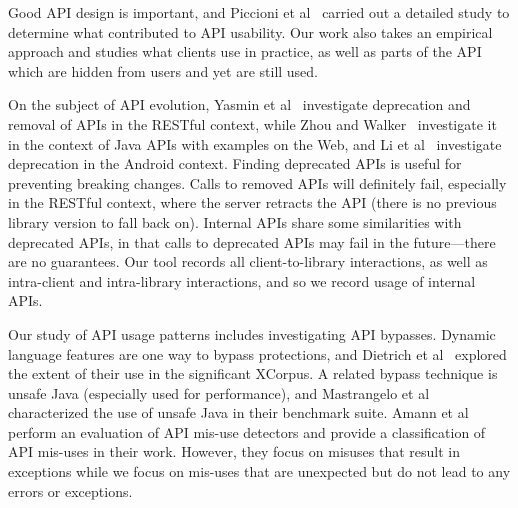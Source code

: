 Good API design is important, and Piccioni et al~\cite{piccioni13:_empir_study_api_usabil} carried out a detailed study to determine what contributed to API usability. Our work also takes an empirical approach and studies what clients use in practice, as well as parts of the API which are hidden from users and yet are still used. 

On the subject of API evolution, Yasmin et al~\cite{yasmin20:_first_look_deprec_restf_apis} investigate deprecation and removal of APIs in the RESTful context, while Zhou and Walker~\cite{zhou16:_api_deprec} investigate it in the context of Java APIs with examples on the Web, and Li et al~\cite{li18:_charac_deprec_android_apis} investigate deprecation in the Android context. Finding deprecated APIs is useful for preventing breaking changes. Calls to removed APIs will definitely fail, especially in the RESTful context, where the server retracts the API (there is no previous library version to fall back on). Internal APIs share some similarities with deprecated APIs, in that calls to deprecated APIs may fail in the future---there are no guarantees. Our tool records all client-to-library interactions, as well as intra-client and intra-library interactions, and so we record usage of internal APIs.

Our study of API usage patterns includes investigating API bypasses. Dynamic language features are one way to bypass protections,
and Dietrich et al~\cite{dietrich2017xcorpus} explored the extent of their use in the significant XCorpus. A related bypass technique
is unsafe Java (especially used for performance), and Mastrangelo et al~\cite{mastrangelo15:_use_your_own_risk} characterized the
use of unsafe Java in their benchmark suite. Amann et al ~\cite{amann2018systematic} perform an evaluation of API mis-use detectors and provide a classification of API mis-uses in their work. However, they focus on misuses that result in exceptions while we focus on mis-uses that are unexpected but do not lead to any errors or exceptions.

